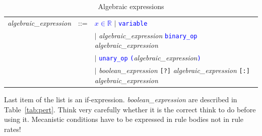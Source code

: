 \documentclass[11pt]{book}
\def\tcb#1{\textcolor{blue}{\ttt{#1}}}
\def\ttt#1{\texttt{#1}}
\def\Real{\mathbb R}
\begin{document}
\begin{table}[htbp]
  \centering
  \caption{Algebraic expressions}
  \begin{tabular}{@{} lcl @{}}
    \textit{algebraic\_expression} & ::= & \tcb{$x\in\Real$} $\mid$ \tcb{variable} \\
     &  & $\mid$ \textit{algebraic\_expression} \tcb{binary\_op} \textit{algebraic\_expression}\\
     &  & $\mid$ \tcb{unary\_op} \tcb{(}\textit{algebraic\_expression}\tcb{)} \\
     &  & $\mid$ \textit{boolean\_expression}  \ttt{[?]} \textit{algebraic\_expression} \ttt{[:]} \textit{algebraic\_expression}\\
  \end{tabular}
  Last item of the list is an
  if-expression. \textit{boolean\_expression} are described in
  Table~\ref{tab:pert}. Think very carefully whether it is the correct
  think to do before using it. Mecanistic conditions have to be
  expressed in rule bodies not in rule rates!
  \label{tab:alg}
\end{table}
\end{document}
